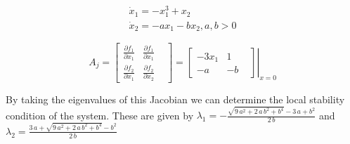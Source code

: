 $$
\begin{array}{l}
\dot{x}_{1}=-x_{1}^{3}+x_{2} \\
\dot{x}_{2}=-a x_{1}-b x_{2}, a, b>0
\end{array}
$$



$$
A_j =
\begin{bmatrix}
  \frac{\partial f_{1}}{\partial x_{1}} & \frac{\partial f_{1}}{\partial x_{1}} & \\

  \frac{\partial f_{2}}{\partial x_{1}} & \frac{\partial f_{2}}{\partial x_{2}}&
\end{bmatrix}
=
\left .
\begin{bmatrix}

-3x_1 & 1 & \\

-a  & -b&

\end{bmatrix} \right\rvert_{x=0}
$$



\noindent By taking the eigenvalues of this Jacobian we can determine the local stability condition of the system. These are given by $\lambda_1 =-\frac{\sqrt{9\,a^2+2\,a\,b^2+b^4}-3\,a+b^2}{2\,b} $ and $ \lambda_2=\frac{3\,a+\sqrt{9\,a^2+2\,a\,b^2+b^4}-b^2}{2\,b}$
